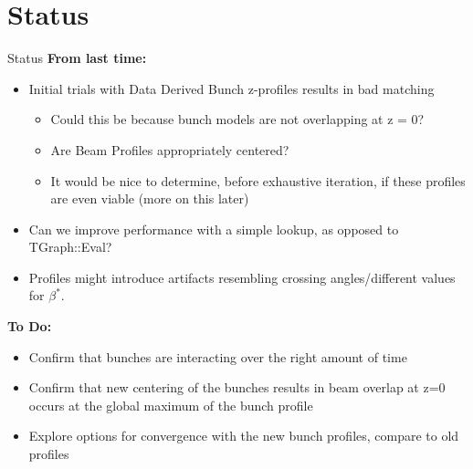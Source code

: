\section{Status}
\label{ch:Status}

\begin{frame}{Status}
	\textbf{From last time:}
\begin{itemize}
	\item Initial trials with Data Derived Bunch z-profiles results in bad matching
		\begin{itemize}
			\item Could this be because bunch models are not overlapping at z = 0?
			\item Are Beam Profiles appropriately centered?
			\item It would be nice to determine, before exhaustive iteration, if
				these profiles are even viable (more on this later)
		\end{itemize}
	\item Can we improve performance with a simple lookup, as opposed to TGraph::Eval?
	\item Profiles might introduce artifacts resembling crossing angles/different
		values for $\beta^{*}$.
\end{itemize}
\textbf{To Do:}
\begin{itemize}
	\item Confirm that bunches are interacting over the right amount of time
	\item Confirm that new centering of the bunches results in beam overlap at
		z=0 occurs at the global maximum of the bunch profile
	\item Explore options for convergence with the new bunch profiles, compare
		to old profiles
\end{itemize}
\end{frame}


